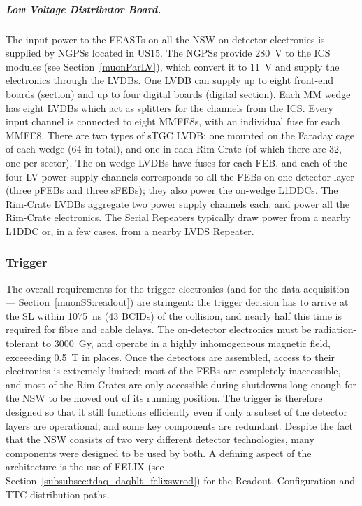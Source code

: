 \documentclass[cernpreprint, atlasdraft=false, UKenglish,british,orcidlogo, texmf, orcidlogo]{atlasdoc}
\begin{document}
\subparagraph{Low Voltage Distributor Board.}
\label{MuSP:LVDB} 
The input power to the \glspl{FEAST} on all the \gls{NSW} on-detector electronics is supplied by \glspl{NGPS} located in \gls{US15}. The \glspl{NGPS} provide \SI{280}{\volt} to the \gls{ICS}~\cite{NSWelx} modules (see Section~\ref{muonParLV}), which convert it to \SI{11}{\volt} and supply the electronics through the \glspl{LVDB}. One \gls{LVDB} can supply up to eight front-end boards (\analog section) and up to four digital boards (digital section).
Each \gls{MM} wedge has eight \glspl{LVDB} which act as splitters for the channels from the \gls{ICS}. Every input channel is connected to eight \glspl{MMFE8}, with an individual fuse for each \gls{MMFE8}.
There are two types of \gls{sTGC} \gls{LVDB}: one mounted on the Faraday cage of each wedge (\num{64} in total), and one in each Rim-Crate (of which there are \num{32}, one per sector).
The on-wedge \glspl{LVDB} have fuses for each \gls{FEB}, and each of the four \gls{LV} power supply channels corresponds to all the \glspl{FEB} on one detector layer (three \glspl{pFEB} and three \glspl{sFEB}); they also power the on-wedge \glspl{L1DDC}.
The Rim-Crate \glspl{LVDB} aggregate two power supply channels each, and power all the Rim-Crate electronics.
The Serial Repeaters typically draw power from a nearby \gls{L1DDC} or, in a few cases, from a nearby \gls{LVDS} Repeater.
 
 
 
\subsubsection{Trigger \label{muonSS:trigger}} 
The overall requirements for the trigger electronics (and for the data acquisition --- Section~\ref{muonSS:readout}) are stringent: the trigger decision has to arrive at the \Gls{SL} within \SI{1075}{\ns} (\num{43} \glspl{BCID}) of the collision,
and nearly half this time is required for fibre and cable delays.
The on-detector electronics must be radiation-tolerant to
\SI{3000}{\gray},
and operate in a highly inhomogeneous magnetic field, exceeeding \SI{0.5}{\tesla} in places.
Once the detectors are assembled, access to their electronics is extremely limited: most of the \glspl{FEB} are completely inaccessible, and most of the Rim Crates are only accessible during shutdowns long enough for the \gls{NSW} to be moved out of its running position. 
The trigger is therefore designed so that it still functions efficiently even if only a subset of the detector layers are operational, and some key components are redundant.
Despite the fact that the \gls{NSW} consists of two very different detector technologies, many components were designed to be used by both.
A defining aspect of the architecture is the use of \gls{FELIX} (see  Section~\ref{subsubsec:tdaq_daqhlt_felixswrod}) for the Readout, Configuration and \gls{TTC} distribution paths.
 
\end{document}
